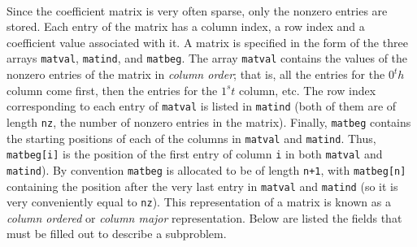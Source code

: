 \begin{description}
\\
Since the coefficient matrix is very often sparse, only the nonzero entries
are stored. Each entry of the matrix has a column index, a row index and a
coefficient value associated with it. A matrix is specified in the form of the
three arrays \texttt{matval}, \texttt{matind}, and \texttt{matbeg}. The array
\texttt{matval} contains the values of the nonzero entries of the matrix in
\emph{column order}; that is, all the entries for the $0^th$ column come first,
then the entries for the $1^st$ column, etc. The row index corresponding to
each entry of \texttt{matval} is listed in \texttt{matind} (both of them are
of length \texttt{nz}, the number of nonzero entries in the matrix).  Finally,
\texttt{matbeg} contains the starting positions of each of the columns in 
\texttt{matval} and \texttt{matind}. Thus, \texttt{matbeg[i]} is the position
of the first entry of column \texttt{i} in both \texttt{matval} and
\texttt{matind}). By convention \texttt{matbeg} is allocated to be of length
\texttt{n+1}, with \texttt{matbeg[n]} containing the position after the very
last entry in \texttt{matval} and \texttt{matind} (so it is very conveniently
equal to \texttt{nz}). This representation of a matrix is known as a {\em
column ordered} or {\em column major} representation. Below are listed the
fields that must be filled out to describe a subproblem.\\
\\


\end{description}
